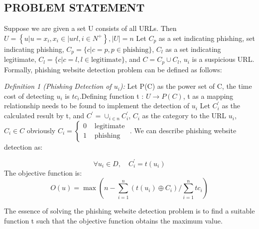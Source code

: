 \documentclass{ieeeaccess}
\begin{document}
\subsection{PROBLEM STATEMENT}
Suppose we are given a set U consists of all URLs. Then 
$U=\left\{u\left|u=x_{i}, x_{i} \in\right| u r l, i \in N^{+}\right\},|U|=n$ Let $C_{p}$ as a set indicating phishing, 
set indicating phishing, $C_{p}=\{c | c=p, p \in \text {phishing}\}$, $C_{l}$ as
a set indicating legitimate, $C_{l}=\{c | c=l, l \in \text {legitimate}\}$, and $C=C_{p} \cup C_{l}$, $u_{i}$ is a suspicious URL. Formally, phishing
website detection problem can be defined as follows:\vspace{6pt} \par \textit{Definition 1 (Phishing Detection of $u_{i}$):} Let P(C) as the
power set of C, the time cost of detecting $u_{i}$ is $tc_{i}$.Defining
function t : $U \rightarrow P(C)$, t as a mapping relationship needs
to be found to implement the detection of $u_{i}$ Let $C_{i}^{\prime}$ as the calculated result by t, and $C^{\prime}=\cup_{i \in n} C_{i}^{\prime}$, $C_{i}$ as the category to the URL $u_{i}$, $C_{i} \in C$ obviously $C_{i}=\left\{\begin{array}{ll}{0} & {\text { legitimate }} \\ {1} & {\text { phishing }}\end{array}\right.$. We can describe phishing website detection as: \vspace{6pt}
\par
\begin{equation}
\forall u_{i} \in D, \quad C_{i}^{\prime}=t\left(u_{i}\right)
\end{equation}
The objective function is:
\begin{equation}
O(u)=\max \left(n-\sum_{i=1}^{n}\left(t\left(u_{i}\right) \oplus C_{i}\right) / \sum_{i=1}^{n} t c_{i}\right)
\end{equation}\par The essence of solving the phishing website detection
problem is to find a suitable function t such that the objective
function obtains the maximum value.
\end{document}
